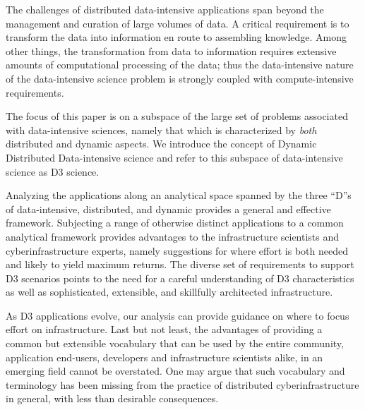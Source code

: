 
The challenges of distributed data-intensive applications span beyond the
management and curation of large volumes of data. A critical requirement is to
transform the data into information en route to assembling knowledge. Among
other things, the transformation from data to information requires extensive
amounts of computational processing of the data; thus the data-intensive nature
of the data-intensive science problem is strongly coupled with compute-intensive
requirements.


The focus of this paper is on a subspace of the large set of problems associated
with data-intensive sciences, namely that which is characterized by {\it both}
distributed and dynamic aspects. We introduce the concept of Dynamic Distributed
Data-intensive science and refer to this subspace of data-intensive science as
D3 science.  

Analyzing the applications along an analytical space spanned by the three ``D''s
of data-intensive, distributed, and dynamic provides a general and effective
framework.  Subjecting a range of otherwise distinct applications to a common
analytical framework provides advantages to the infrastructure scientists and
cyberinfrastructure experts, namely suggestions for where effort is both needed
and likely to yield maximum returns.  The diverse set of requirements to support
D3 scenarios points to the need for a careful understanding of D3
characteristics as well as sophisticated, extensible, and skillfully architected
infrastructure.

As D3 applications evolve, our analysis can provide guidance on where to focus
effort on infrastructure.  Last but not least, the advantages of providing a
common but extensible vocabulary that can be used by the entire community,
application end-users, developers and infrastructure scientists alike, in an
emerging field cannot be overstated. One may argue that such vocabulary and
terminology has been missing from the practice of distributed
cyberinfrastructure in general, with less than desirable consequences.



